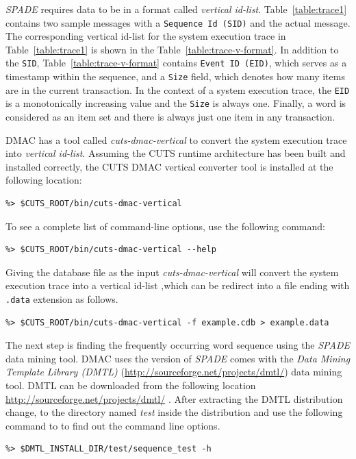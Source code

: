 \textit{SPADE} requires data to be in a format called 
\textit{vertical id-list}. Table~\ref{table:trace1} contains 
two sample messages with a \texttt{Sequence Id (SID)} and 
the actual message. The corresponding vertical id-list for
the system execution trace in Table~\ref{table:trace1} is 
shown in the Table~\ref{table:trace-v-format}.  In addition 
to the \texttt{SID}, Table~\ref{table:trace-v-format} contains 
\texttt{Event ID (EID)}, which serves as a timestamp within
the sequence, and a \texttt{Size} field, which denotes how
many items are in the current transaction. In the context of 
a system execution trace, the \texttt{EID} is a monotonically 
increasing value and the \texttt{Size} is always one. Finally,
a word is considered as an item set and there is always just
one item in any transaction. 

DMAC has a tool called \textit{cuts-dmac-vertical} to convert the 
system execution trace into \textit{vertical id-list}.
Assuming the CUTS runtime architecture has been built 
and installed correctly, the CUTS DMAC vertical converter 
tool is installed at the following location:
\begin{lstlisting}
%> $CUTS_ROOT/bin/cuts-dmac-vertical
\end{lstlisting}
To see a complete list of command-line options, use the following 
command:
\begin{lstlisting}
%> $CUTS_ROOT/bin/cuts-dmac-vertical --help
\end{lstlisting}

Giving the database file as the input \textit{cuts-dmac-vertical} will 
convert the system execution trace into a vertical id-list ,which can be 
redirect into a file ending with \texttt{.data} extension 
as follows.
\begin{lstlisting}
%> $CUTS_ROOT/bin/cuts-dmac-vertical -f example.cdb > example.data
\end{lstlisting}

The next step is finding the frequently occurring word sequence using the 
\textit{SPADE} data mining tool. DMAC uses the version of \textit{SPADE} 
comes with the \textit{Data Mining Template Library (DMTL)}
(\url{http://sourceforge.net/projects/dmtl/}) data mining tool. 
DMTL can be downloaded from the following location
\url{http://sourceforge.net/projects/dmtl/} . 
After extracting the DMTL distribution change, to the directory named \textit{test} 
inside the distribution and use the following command to to find out 
the command line options.
\begin{lstlisting}
%> $DMTL_INSTALL_DIR/test/sequence_test -h
\end{lstlisting}

